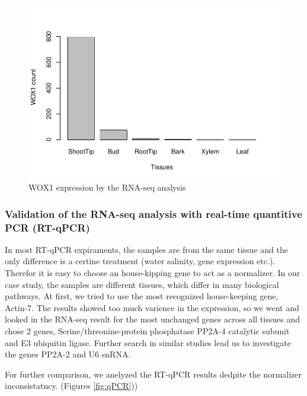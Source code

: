 \documentclass[
]{article}
\begin{document}
\begin{figure}[h]

{\centering \includegraphics[width=0.8\linewidth]{Developing-noval-methods-for-gene-editing-in-trees_files/figure-latex/RNA-seq-1} 

}

\caption{WOX1 expression by the RNA-seq analysis}\label{fig:RNA-seq}
\end{figure}

\hypertarget{validation-of-the-rna-seq-analysis-with-real-time-quantitive-pcr-rt-qpcr-1}{%
\subsubsection{Validation of the RNA-seq analysis with real-time
quantitive PCR
(RT-qPCR)}\label{validation-of-the-rna-seq-analysis-with-real-time-quantitive-pcr-rt-qpcr-1}}

In most RT-qPCR expiraments, the samples are from the same tissue and
the only difference is a certine treatment (water salinity, gene
expression etc.). Therefor it is easy to choose an house-kipping gene to
act as a normalizer. In our case study, the samples are different
tissues, which differ in many biological pathways. At first, we tried to
use the most recognized house-keeping gene, Actin-7. The results showed
too much varience in the expression, so we went and looked in the
RNA-seq result for the most unchanged genes across all tissues and chose
2 genes, Serine/threonine-protein phosphatase PP2A-4 catalytic subunit
and E3 ubiquitin ligase. Further search in similar studies lead us to
investigate the genes PP2A-2 and U6 snRNA.

For further comparison, we anelyzed the RT-qPCR results dedpite the
normalizer inconsistatncy. (Figures \ref{fig:qPCR}))
\end{document}
